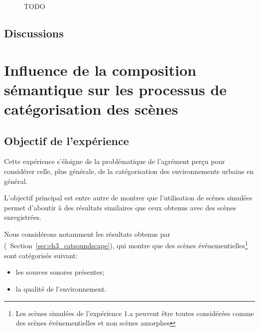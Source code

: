 \begin{figure}[t]
        \caption[TODO]{TODO}\label{fig:soundlevelSansMarker}
\end{figure}

\subsection{Discussions}


\section[Composition sémantique et catégorisation]{Influence de la composition sémantique sur les processus de catégorisation des scènes}
\label{sec:xp4}

\subsection{Objectif de l'expérience}
\label{sec:ch5_objXp3}

Cette  expérience s'éloigne de la problématique de l'agrément perçu pour considérer celle, plus générale, de la catégorisation des environnements urbains en général. 

L'objectif principal est entre autre de montrer que l’utilisation de scènes simulées permet d'aboutir à des résultats similaires que ceux obtenus avec des scènes enregistrées.

Nous considérons notamment les résultats obtenus par \citep{maffiolo_caracterisation_1999} (\cf~Section~\ref{sec:ch3_catsoundscape}), qui montre que des scènes événementielles\footnote{Les scènes simulées de l'expérience 1.a peuvent être toutes considérées comme des scènes événementielles et non scènes amorphes} sont catégorisés suivant:

\begin{itemize}
\item les sources sonores présentes;
\item la qualité de l'environnement.
\end{itemize}

